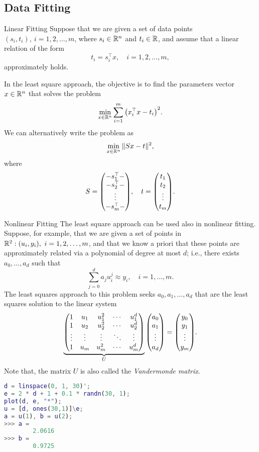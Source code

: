 \subsection{Data Fitting}
\begin{df}{Linear Fitting}
	Suppose that we are given a set of data points $(s_i,t_i),\ i=1,2,\dots,m$, where $s_i\in{\mathbb{R}}^n$ and $t_i\in{\mathbb{R}}$, and assume that a linear relation of the form \[t_i=s_i^\top x,\quad i=1,2,\dots,m,\] approximately holds. 
\end{df}
\begin{sol}
	In the least square approach, the objective is to find the parameters vector $x\in{\mathbb{R}}^n$ that solves the problem \[\min_{x\in{\mathbb{R}}^n}\sum_{i=1}^m\qty(x_i^\top x-t_i)^2.\] We can alternatively write the problem as \[\min_{x\in{\mathbb{R}}^n}\|Sx-t\|^2,\] where \[S=\mqty(-s_1^\top-\\-s_2^\top-\\\vdots\\-s_m^\top-),\quad t=\mqty(t_1\\t_2\\\vdots\\t_m).\]
\end{sol}
\begin{df}{Nonlinear Fitting}
	The least square approach can be used also in nonlinear fitting. Suppose, for example, that we are given a set of points in $\R^2:\qty(u_i,y_i),\ i=1,2,\dots,m$, and that we know a priori that these points are approximately related via a polynomial of degree at most $d$; i.e., there exists $a_0,\dots,a_d$ such that \[\sum_{j=0}^da_ju_i^j\approx y_i,\quad i=1,\dots,m.\] The least squares approach to this problem seeks $a_0,a_1,\dots,a_d$ that are the least squares solution to the linear system \[\underbrace{\mqty(1&u_1&u_1^2&\cdots&u_1^d\\1&u_2&u_2^2&\cdots&u_2^d\\\vdots&\vdots&\vdots&\ddots&\vdots\\1&u_m&u_m^2&\cdots&u_m^d)}_{U}\mqty(a_0\\a_1\\\vdots\\a_d)=\mqty(y_0\\y_1\\\vdots\\y_m).\]
	Note that, the matrix $U$ is also called the \textit{Vandermonde matrix}.
\end{df}
\begin{lstlisting}[title=Data Fitting, language=matlab]
d = linspace(0, 1, 30)';
e = 2 * d + 1 + 0.1 * randn(30, 1);
plot(d, e, "*");
u = [d, ones(30,1)]\e;
a = u(1), b = u(2);
>>> a = 
		2.0616
>>> b = 
		0.9725
\end{lstlisting}

